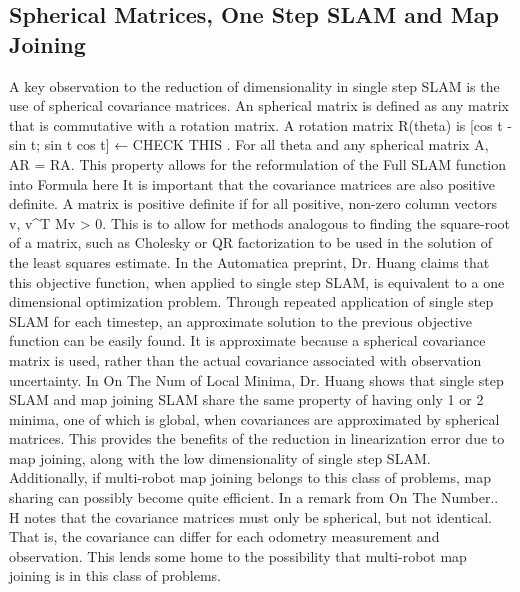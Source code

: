\documentclass[12pt]{article}
\begin{document}
\subsection{ Spherical Matrices, One Step SLAM and Map Joining}
A key observation to the reduction of dimensionality in single step SLAM is the 	use of spherical covariance matrices.  An spherical matrix is defined as any matrix that is commutative with a rotation matrix.  A rotation matrix R(theta) is [cos t -sin t; sin t cos t] ← CHECK THIS  .  For all theta and any spherical matrix A, AR = RA.  
This property allows for the reformulation of the Full SLAM function into 
Formula here
It is important that the covariance matrices are also positive definite.  A matrix is positive definite if for all positive, non-zero column vectors v, v^T Mv > 0. This is to allow for methods analogous to finding the square-root of a matrix, such as Cholesky or QR factorization to be used in the solution of the least squares estimate. 
In the Automatica preprint, Dr. Huang claims that this objective function, when applied to single step SLAM, is equivalent to a one dimensional optimization problem.  Through repeated application of single step SLAM for each timestep, an approximate solution to the previous objective function can be easily found.  It is approximate because a spherical covariance matrix is used, rather than the actual covariance associated with observation uncertainty.
In On The Num of Local Minima, Dr. Huang shows that single step SLAM and map joining SLAM share the same property of having only 1 or 2 minima, one of which is global, when covariances are approximated by spherical matrices.  This provides the benefits of the reduction in linearization error due to map joining, along with the low dimensionality of single step SLAM.  Additionally, if multi-robot map joining belongs to this class of problems, map sharing can possibly become quite efficient.
In a remark from On The Number.. H notes that the covariance matrices must only be spherical, but not identical.  That is, the covariance can differ for each odometry measurement and observation.  This lends some home to the possibility that multi-robot map joining is in this class of problems.
\end{document}
